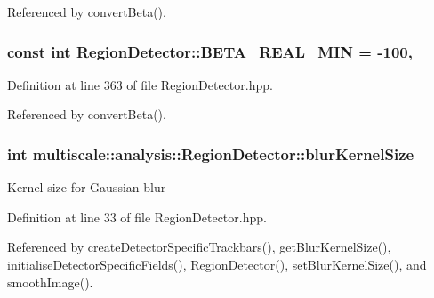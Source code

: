 Referenced by convert\-Beta().

\hypertarget{classmultiscale_1_1analysis_1_1RegionDetector_a87d07b8a993b50bcf050e4c206ac126c}{
\subsubsection[{B\-E\-T\-A\-\_\-\-R\-E\-A\-L\-\_\-\-M\-I\-N}]{\setlength{\rightskip}{0pt plus 5cm}const int Region\-Detector\-::\-B\-E\-T\-A\-\_\-\-R\-E\-A\-L\-\_\-\-M\-I\-N = -\/100\hspace{0.3cm}{\ttfamily [static]}, {\ttfamily [private]}}}\label{classmultiscale_1_1analysis_1_1RegionDetector_a87d07b8a993b50bcf050e4c206ac126c}


Definition at line 363 of file Region\-Detector.\-hpp.



Referenced by convert\-Beta().

\hypertarget{classmultiscale_1_1analysis_1_1RegionDetector_aae6ee0ec7f0a610dd8a906c1eb181bc7}{
\subsubsection[{blur\-Kernel\-Size}]{\setlength{\rightskip}{0pt plus 5cm}int multiscale\-::analysis\-::\-Region\-Detector\-::blur\-Kernel\-Size\hspace{0.3cm}{\ttfamily [private]}}}\label{classmultiscale_1_1analysis_1_1RegionDetector_aae6ee0ec7f0a610dd8a906c1eb181bc7}
Kernel size for Gaussian blur 

Definition at line 33 of file Region\-Detector.\-hpp.



Referenced by create\-Detector\-Specific\-Trackbars(), get\-Blur\-Kernel\-Size(), initialise\-Detector\-Specific\-Fields(), Region\-Detector(), set\-Blur\-Kernel\-Size(), and smooth\-Image().

